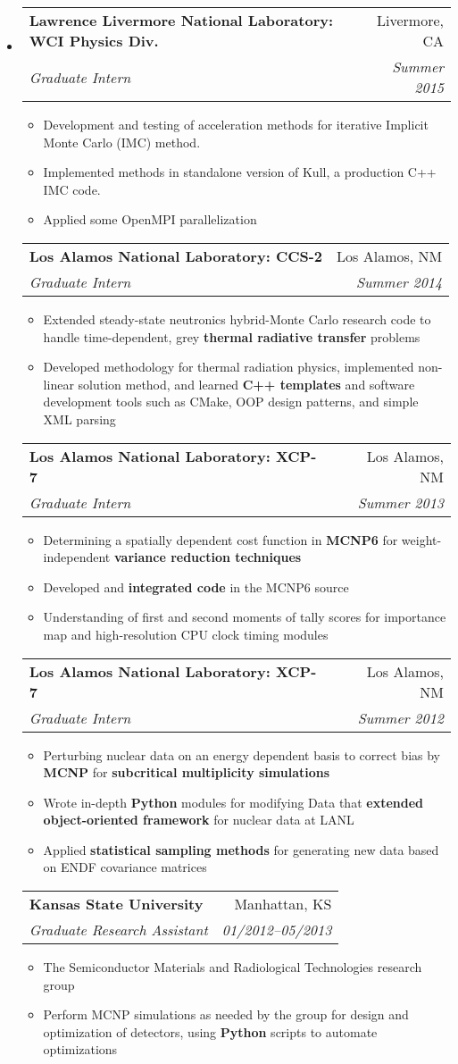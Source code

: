 \documentclass[letterpaper,11pt]{article}
\makeatletter
\newcommand{\resitem}[1]{\item #1 \vspace{-2pt}}
\newcommand{\ressubheading}[4]{
\begin{tabular*}{6.5in}{l@{\cftdotfill{\cftsecdotsep}\extracolsep{\fill}}r}
		\textbf{\hspace{-0.341in}#1} & #2 \\
		\textit{#3} & \textit{#4} \\
\end{tabular*}\vspace{-6pt}}
\makeatother
\begin{document}
\begin{itemize}
\item[]
\ressubheading{Lawrence Livermore National Laboratory: WCI Physics Div.}{Livermore, CA}{Graduate Intern}{Summer 2015}
	\begin{itemize}
	\resitem{Development and testing of acceleration methods for iterative Implicit Monte Carlo (IMC) method.}
	\resitem{Implemented methods in standalone version of Kull, a production C++ IMC code.}
	\resitem{Applied some OpenMPI parallelization}
	\end{itemize}
\ressubheading{Los Alamos National Laboratory: CCS-2}{Los Alamos, NM}{Graduate Intern}{Summer 2014}
	\begin{itemize}
	\resitem{Extended steady-state neutronics hybrid-Monte Carlo research code to handle time-dependent, grey \textbf{thermal radiative transfer} problems}
	\resitem{Developed methodology for thermal radiation physics, implemented non-linear solution method, and learned \textbf{C++ templates} and software development tools such as CMake, OOP design patterns, and simple XML parsing}
	\end{itemize}
 \ressubheading{Los Alamos National Laboratory: XCP-7}{Los Alamos, NM}{Graduate Intern}{Summer 2013}
	\begin{itemize}
	\resitem{Determining a spatially dependent cost function in \textbf{MCNP6} for weight-independent \textbf{variance reduction techniques}}
	\resitem{Developed and \textbf{integrated code} in the MCNP6 source}
	\resitem{Understanding of first and second moments of tally scores for importance map and high-resolution CPU clock timing modules}
	\end{itemize}
\ressubheading{Los Alamos National Laboratory: XCP-7}{Los Alamos, NM}{Graduate Intern}{Summer 2012}
	\begin{itemize}
	\resitem{Perturbing nuclear data on an energy dependent basis to correct bias by \textbf{MCNP} for \textbf{subcritical multiplicity simulations}}
	\resitem{Wrote in-depth \textbf{Python} modules for modifying Data that \textbf{extended object-oriented framework} for nuclear data at LANL}
	\resitem{Applied \textbf{statistical sampling methods} for generating new data based on ENDF covariance matrices}
	\end{itemize}
\ressubheading{Kansas State University}{Manhattan, KS}{Graduate Research Assistant}{01/2012--05/2013}
	\begin{itemize}
	\resitem{The Semiconductor Materials and Radiological Technologies research group}
	\resitem{Perform MCNP simulations as needed by the group for design and optimization of detectors, using \textbf{Python} scripts to automate optimizations}

\end{itemize}
\end{itemize}
\end{document}
